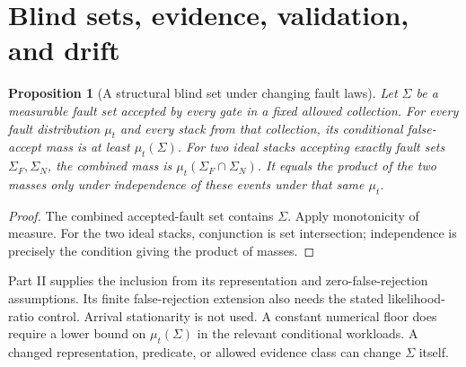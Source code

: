 \documentclass[11pt]{article}
\newtheorem{proposition}[theorem]{Proposition}
\theoremstyle{definition}
\theoremstyle{remark}
\begin{document}
\section{Blind sets, evidence, validation, and drift}\label{sec:evidence}
\begin{proposition}[A structural blind set under changing fault laws]\label{prop:blind}
Let $\Sigma$ be a measurable fault set accepted by every gate in a fixed allowed collection.
For every fault distribution $\mu_t$ and every stack from that collection,
its conditional false-accept mass is at least $\mu_t(\Sigma)$.
For two ideal stacks accepting exactly fault sets $\Sigma_F,\Sigma_N$, the combined mass is
$\mu_t(\Sigma_F\cap\Sigma_N)$. It equals the product of the two masses only under independence
of these events under that same $\mu_t$.
\end{proposition}
\begin{proof}
The combined accepted-fault set contains $\Sigma$. Apply monotonicity of measure.
For the two ideal stacks, conjunction is set intersection; independence is precisely the
condition giving the product of masses.
\end{proof}
Part II supplies the inclusion from its representation and zero-false-rejection assumptions.
Its finite false-rejection extension also needs the stated likelihood-ratio control.
Arrival stationarity is not used. A constant numerical floor does require a lower bound on
$\mu_t(\Sigma)$ in the relevant conditional workloads. A changed representation, predicate,
or allowed evidence class can change $\Sigma$ itself.
\end{document}
